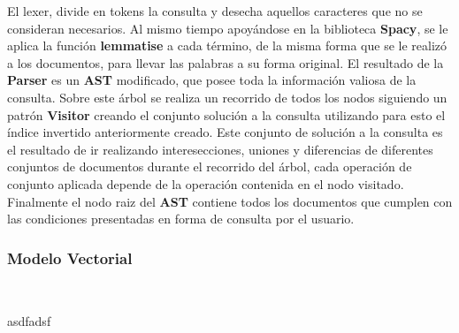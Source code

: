 \documentclass{llncs}
\begin{document}
El lexer, divide en tokens la consulta y desecha aquellos caracteres que no se consideran necesarios. Al mismo tiempo apoyándose en la biblioteca {\bfseries Spacy}, se le aplica la función {\bfseries lemmatise} a cada término, de la misma forma que se le realizó a los documentos, para llevar las palabras a su forma original. El resultado de la {\bfseries Parser} es un {\bfseries AST} modificado, que posee toda la información valiosa de la consulta. Sobre este árbol se realiza un recorrido de todos los nodos siguiendo un patrón {\bfseries Visitor} creando el conjunto solución a la consulta utilizando para esto el índice invertido anteriormente creado. Este conjunto de solución a la consulta es el resultado de ir realizando interesecciones, uniones y diferencias de diferentes conjuntos de documentos durante el recorrido del árbol, cada operación de conjunto aplicada depende de la operación contenida en el nodo visitado. Finalmente el nodo raiz del {\bfseries AST} contiene todos los documentos que cumplen con las condiciones presentadas en forma de consulta por el usuario.

\subsubsection{Modelo Vectorial}\

asdfadsf
\end{document}
